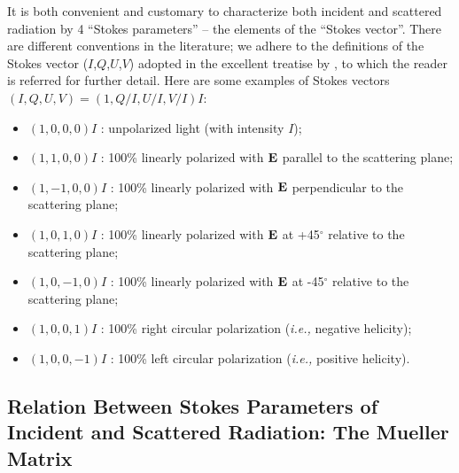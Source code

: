 It is both convenient and customary to characterize both incident and
scattered radiation by 4 ``Stokes parameters'' -- 
the elements of the ``Stokes vector''.
There are different conventions in the literature; we adhere to the
definitions of the Stokes vector ($I$,$Q$,$U$,$V$) adopted in the
excellent treatise by \citet{Bohren+Huffman_1983}, 
to which the reader is referred for further detail.
Here are some examples of Stokes vectors $(I,Q,U,V)=(1,Q/I,U/I,V/I)I$:
\begin{itemize}
\item $(1,0,0,0)I$ : unpolarized light (with intensity $I$);
\item $(1,1,0,0)I$ : 100\% linearly polarized with ${\bf E}$ parallel to the
        scattering plane;
\item $(1,-1,0,0)I$ : 100\% linearly polarized with ${\bf E}$ perpendicular
        to the scattering plane;
\item $(1,0,1,0)I$ : 100\% linearly polarized with ${\bf E}$ at +45$^\circ$
        relative to the scattering plane;
\item $(1,0,-1,0)I$ : 100\% linearly polarized with ${\bf E}$ at -45$^\circ$
        relative to the scattering plane;
\item $(1,0,0,1)I$ : 100\% right circular polarization ({\it i.e.,} negative
        helicity);
\item $(1,0,0,-1)I$ : 100\% left circular polarization ({\it i.e.,} positive
        helicity).
\end{itemize}

\subsection{Relation Between Stokes Parameters of Incident and Scattered
Radiation: The Mueller Matrix}

